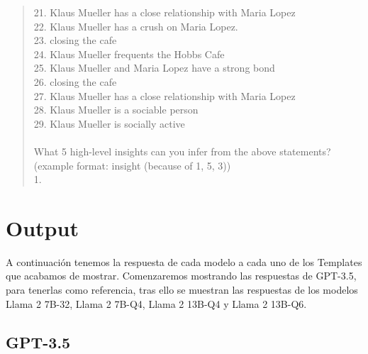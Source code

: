\begin{quote}
{		21. Klaus Mueller has a close relationship with Maria Lopez \\
		22. Klaus Mueller has a crush on Maria Lopez. \\
		23. closing the cafe \\
		24. Klaus Mueller frequents the Hobbs Cafe \\
		25. Klaus Mueller and Maria Lopez have a strong bond \\
		26. closing the cafe \\
		27. Klaus Mueller has a close relationship with Maria Lopez \\
		28. Klaus Mueller is a sociable person \\
		29. Klaus Mueller is socially active \\
		 \\
		What 5 high-level insights can you infer from the above statements? (example format: insight (because of 1, 5, 3)) \\
		1.
	}
\end{quote}
\newpage

\section{Output}

A continuación tenemos la respuesta de cada modelo a cada uno de los Templates que acabamos de mostrar. Comenzaremos mostrando las respuestas de GPT-3.5, para tenerlas como referencia, tras ello se muestran las respuestas de los modelos Llama 2 7B-32, Llama 2 7B-Q4, Llama 2 13B-Q4 y Llama 2 13B-Q6.

\subsection{GPT-3.5}

\begin{multicols}{2}
\begin{quote}
\end{quote}

\columnbreak

\begin{quote}
\end{quote}
\end{multicols}

